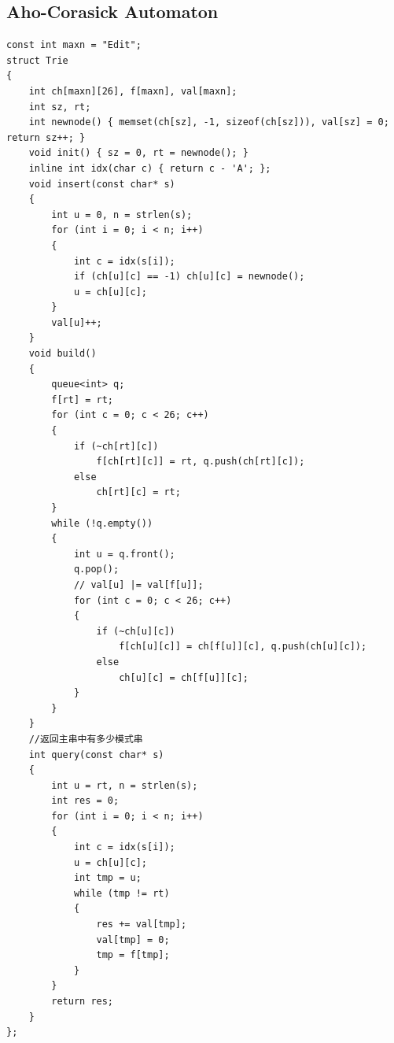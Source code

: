 \documentclass[twoside]{article}
\begin{document}
\subsection{Aho-Corasick Automaton}
\begin{lstlisting}
const int maxn = "Edit";
struct Trie
{
    int ch[maxn][26], f[maxn], val[maxn];
    int sz, rt;
    int newnode() { memset(ch[sz], -1, sizeof(ch[sz])), val[sz] = 0; return sz++; }
    void init() { sz = 0, rt = newnode(); }
    inline int idx(char c) { return c - 'A'; };
    void insert(const char* s)
    {
        int u = 0, n = strlen(s);
        for (int i = 0; i < n; i++)
        {
            int c = idx(s[i]);
            if (ch[u][c] == -1) ch[u][c] = newnode();
            u = ch[u][c];
        }
        val[u]++;
    }
    void build()
    {
        queue<int> q;
        f[rt] = rt;
        for (int c = 0; c < 26; c++)
        {
            if (~ch[rt][c])
                f[ch[rt][c]] = rt, q.push(ch[rt][c]);
            else
                ch[rt][c] = rt;
        }
        while (!q.empty())
        {
            int u = q.front();
            q.pop();
            // val[u] |= val[f[u]];
            for (int c = 0; c < 26; c++)
            {
                if (~ch[u][c])
                    f[ch[u][c]] = ch[f[u]][c], q.push(ch[u][c]);
                else
                    ch[u][c] = ch[f[u]][c];
            }
        }
    }
    //返回主串中有多少模式串
    int query(const char* s)
    {
        int u = rt, n = strlen(s);
        int res = 0;
        for (int i = 0; i < n; i++)
        {
            int c = idx(s[i]);
            u = ch[u][c];
            int tmp = u;
            while (tmp != rt)
            {
                res += val[tmp];
                val[tmp] = 0;
                tmp = f[tmp];
            }
        }
        return res;
    }
};
\end{lstlisting}
\end{document}
